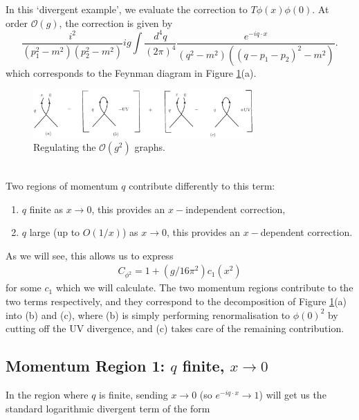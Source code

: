 \documentclass{article}
\begin{document}
In this `divergent example', we evaluate the correction to $T\phi(x)\phi(0)$. At order $\mathcal{O}(g)$, the correction is given by
\begin{equation}
    \frac{i^2}{(p_1^2-m^2)(p_2^2-m^2)}ig\int \frac{d^4q}{(2\pi)^4} \frac{e^{-iq\cdot x}}{(q^2-m^2)((q-p_1-p_2)^2 - m^2)}.
    \label{loopOg}
\end{equation}
which corresponds to the Feynman diagram in Figure \ref{fig:10.1.3abc}(a).\\

\begin{figure}[H]
\centering
\includegraphics[width=0.75\textwidth]{Graphs/Fig1013abc.eps}
\caption{Regulating the $\mathcal{O}(g^2)$ graphs.}
\label{fig:10.1.3abc}
\end{figure}\\

Two regions of momentum $q$ contribute differently to this term:
\begin{enumerate}
    \item $q$ finite as $x \rightarrow 0$, this  provides an $x-$independent correction,
    \item $q$ large (up to $O(1/x)$) as $x \rightarrow 0$, this  provides an $x-$dependent correction.
\end{enumerate}
As we will see, this allows us to express 
\begin{align}
    C_{\phi^2} = 1 + (g/16\pi^2)c_1(x^2)
\end{align}
for some $c_1$ which we will calculate. The two momentum regions contribute to the two terms respectively, and they correspond to the decomposition of Figure \ref{fig:10.1.3abc}(a) into (b) and (c), where (b) is simply performing renormalisation to $\phi(0)^2$ by cutting off the UV divergence, and (c) takes care of the remaining contribution. 
\subsection{Momentum Region 1: $q$ finite, $x\rightarrow 0$}

In the region where $q$ is finite, sending $x\rightarrow 0$ (so $e^{-iq\cdot x} \rightarrow 1$) will get  us the standard logarithmic divergent term of the form 
\end{document}
